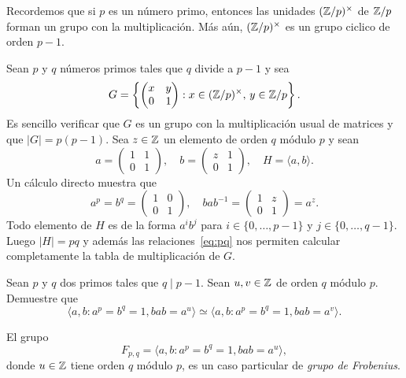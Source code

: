     

Recordemos que si $p$ es un número primo, entonces
las unidades $(\mathbb{Z}/p)^{\times}$ 
de $\mathbb{Z}/p$ forman un grupo con la multiplicación. Más aún, 
$(\mathbb{Z}/p)^{\times}$ 
es un grupo ciclico de orden $p-1$. 

Sean $p$ y $q$ números primos tales que $q$ divide a $p-1$ y sea
\[
G=\left\{\begin{pmatrix}
x & y\\
0 & 1
\end{pmatrix}
:x\in(\mathbb{Z}/p)^\times,\,y\in\mathbb{Z}/p\right\}.
\]
Es sencillo verificar que $G$ es un grupo con la multiplicación usual de matrices y que
$|G|=p(p-1)$. Sea $z\in\mathbb{Z}$ un elemento de orden $q$ módulo $p$ y sean  
\[
a=\begin{pmatrix}
1&1\\
0&1
\end{pmatrix},
\quad
b=\begin{pmatrix}
z&1\\
0&1
\end{pmatrix},
\quad
H=\langle a,b\rangle.
\]
Un cálculo directo muestra
que 
\begin{equation}
\label{eq:pq}
a^p=b^q=\begin{pmatrix}
1&0\\
0&1
\end{pmatrix},
\quad
bab^{-1}=\begin{pmatrix}
1&z\\
0&1
\end{pmatrix}
=a^z.
\end{equation}
Todo elemento de $H$ es de la forma $a^ib^j$ para $i\in\{0,\dots,p-1\}$ y $j\in\{0,\dots,q-1\}$. 
Luego $|H|=pq$ y además las relaciones~\eqref{eq:pq} nos permiten 
calcular completamente la tabla de multiplicación de $G$. 

\begin{exercise}
Sean $p$ y $q$ dos primos tales que $q\mid p-1$. Sean $u,v\in\mathbb{Z}$ de orden $q$ módulo $p$. 
Demuestre que
\[
\langle a,b:a^p=b^q=1,bab=a^u\rangle
\simeq \langle a,b:a^p=b^q=1,bab=a^v\rangle.
\]
\end{exercise}

El grupo  
\[
F_{p,q}=\langle a,b:a^p=b^q=1,bab=a^u\rangle,
\]
donde $u\in\mathbb{Z}$ tiene orden $q$ módulo $p$, 
es un caso particular de 
\emph{grupo de Frobenius}. 

